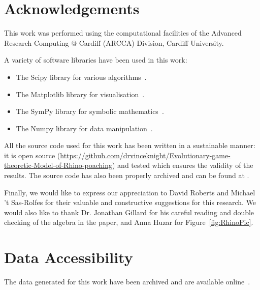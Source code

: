 \documentclass[10pt]{article}
\begin{document}
\section*{Acknowledgements}

This work was performed using the computational facilities of the Advanced
Research Computing @ Cardiff (ARCCA) Division, Cardiff University.

A variety of software libraries have been used in this work:

\begin{itemize}
    \item The Scipy library for various algorithms~\cite{scipy}.
    \item The Matplotlib library for visualisation~\cite{hunter2007matplotlib}.
    \item The SymPy library for symbolic mathematics~\cite{sympy}.
    \item The Numpy library for data manipulation~\cite{walt2011numpy}.
\end{itemize}

All the source code used for this work has been written in a sustainable manner: it is
open source (\url{https://github.com/drvinceknight/Evolutionary-game-theoretic-Model-of-Rhino-poaching})
and tested which ensures the validity of the results. The source code
has also been properly archived and can be found at \cite{Evorepo2018}.

Finally, we would like to express our appreciation to David Roberts and Michael 't
Sas-Rolfes for their valuable and constructive suggestions for this research.
We would also like to thank
Dr. Jonathan Gillard for his careful reading and double checking of the algebra in the paper,
and Anna Huzar for Figure~\ref{fig:RhinoPic}.

\section*{Data Accessibility}

The data generated for this work have been archived and are available
online~\cite{Glynatsi2017}.



\end{document}
